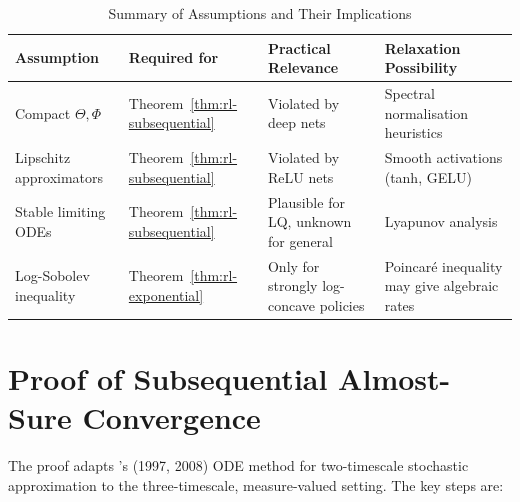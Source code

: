 \begin{table}[ht]
\centering
\small
\caption{Summary of Assumptions and Their Implications}
\label{tab:rl-assumptions}
\begin{tabular}{p{2.5cm}p{2.2cm}p{2.5cm}p{4cm}}
\toprule
\textbf{Assumption} & \textbf{Required for} & \textbf{Practical Relevance} &
    \textbf{Relaxation Possibility} \\
\midrule
Compact $\Theta, \Phi$ & Theorem~\ref{thm:rl-subsequential} & Violated by deep nets &
    Spectral normalisation heuristics \\
Lipschitz approximators & Theorem~\ref{thm:rl-subsequential} & Violated by ReLU nets
    & Smooth activations (tanh, GELU) \\
Stable limiting ODEs & Theorem~\ref{thm:rl-subsequential} & Plausible for LQ, unknown
    for general & Lyapunov analysis \\
Log-Sobolev inequality & Theorem~\ref{thm:rl-exponential} & Only for strongly
    log-concave policies & Poincar\'e inequality may give algebraic rates \\
\bottomrule
\end{tabular}
\end{table}


\section{Proof of Subsequential Almost-Sure Convergence}
\label{sec:rl-proof-subsequential}

The proof adapts \citet{borkar1997,borkar2008}'s (1997, 2008) ODE method for two-timescale stochastic
approximation to the three-timescale, measure-valued setting. The key steps are:

